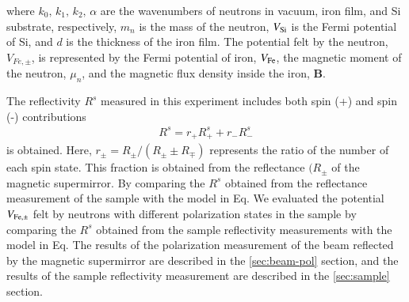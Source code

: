 \documentclass{jps-cp}
\begin{document}
 where $k_0,\,k_1,\,k_2,\,\alpha$ are the wavenumbers of neutrons in vacuum, iron film, and Si substrate, respectively, $m_n$ is the mass of the neutron, $V_{\rm Si}$ is the Fermi potential of Si, and $d$ is the thickness of the iron film.
The potential felt by the neutron, $V_{Fe,\pm}$, is represented by the Fermi potential of iron, $V_{\rm Fe}$, the magnetic moment of the neutron, $\mu_n$, and the magnetic flux density inside the iron, $\boldsymbol B$.

The reflectivity $R^s$ measured in this experiment includes both spin (+) and spin (-) contributions 
\begin{align}
R^s=r_{+} R^s_{+} + r_{-} R^s_{-} 
\label{Rs}
\end{align}
is obtained. Here, $r_{\pm}=R_\pm/(R_{\pm}\pm R_{\mp})$ represents the ratio of the number of each spin state. This fraction is obtained from the reflectance $(R_{\pm}$ of the magnetic supermirror.
By comparing the $R^s$ obtained from the reflectance measurement of the sample with the model in Eq.
We evaluated the potential $V_{\rm Fe,\pm}$ felt by neutrons with different polarization states in the sample by comparing the $R^s$ obtained from the sample reflectivity measurements with the model in Eq.
The results of the polarization measurement of the beam reflected by the magnetic supermirror are described in the \ref{sec:beam-pol} section, and the results of the sample reflectivity measurement are described in the \ref{sec:sample} section.


\end{document}

